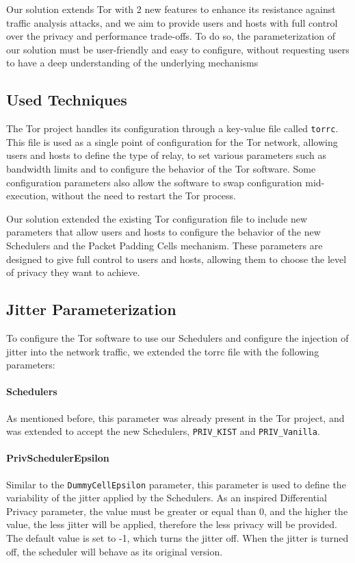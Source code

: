 Our solution extends Tor with 2 new features to enhance its resistance against traffic analysis attacks, and we aim to provide users and hosts with full control over the privacy and performance trade-offs. To do so, the parameterization of our solution must be user-friendly and easy to configure, without requesting users to have a deep understanding of the underlying mechanisms 


\subsection{Used Techniques}\label{sec:used_techniques}

The Tor project handles its configuration through a key-value file called \texttt{torrc}. This file is used as a single point of configuration for the Tor network, allowing users and hosts to define the type of relay, to set various parameters such as bandwidth limits and to configure the behavior of the Tor software. Some configuration parameters also allow the software to swap configuration mid-execution, without the need to restart the Tor process.

Our solution extended the existing Tor configuration file to include new parameters that allow users and hosts to configure the behavior of the new Schedulers and the Packet Padding Cells mechanism. These parameters are designed to give full control to users and hosts, allowing them to choose the level of privacy they want to achieve.


\subsection{Jitter Parameterization}\label{sec:jitter_parameterization}

To configure the Tor software to use our Schedulers and configure the injection of jitter into the network traffic, we extended the torrc file with the following parameters: 

\paragraph{Schedulers} As mentioned before, this parameter was already present in the Tor project, and was extended to accept the new Schedulers, \texttt{PRIV\_KIST} and \texttt{PRIV\_Vanilla}. 

\paragraph{PrivSchedulerEpsilon} Similar to the \texttt{DummyCellEpsilon} parameter, this parameter is used to define the variability of the jitter applied by the Schedulers. As an inspired Differential Privacy parameter, the value must be greater or equal than 0, and the higher the value, the less jitter will be applied, therefore the less privacy will be provided. The default value is set to -1, which turns the jitter off. When the jitter is turned off, the scheduler will behave as its original version.  

